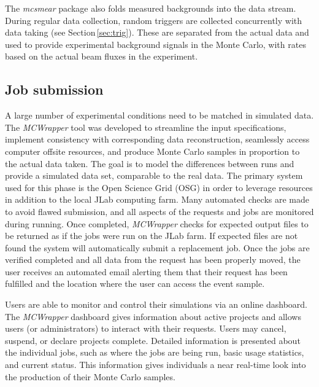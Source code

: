 The \textit{mcsmear} package also folds measured backgrounds into the data stream. During regular data collection, random triggers are collected concurrently with data taking (see Section\,\ref{sec:trig}). These are separated from the actual data and used to provide experimental background signals in the Monte Carlo, with rates based on the actual beam fluxes in the experiment. 

\subsection{Job submission \label{sec:jobsubmission}}
A large number of experimental conditions need to be matched in simulated data. The \emph{MCWrapper} tool was 
developed to streamline the input specifications, implement consistency with corresponding data reconstruction, seamlessly access computer offsite resources, and produce Monte Carlo samples in proportion to the actual data taken. The goal is to model the differences between runs and provide a simulated data set, comparable to the real data. The primary system used for this phase is the Open Science Grid (OSG) in order to leverage resources in addition to the local JLab computing farm. Many automated checks are made to avoid flawed submission, and all aspects of the requests and jobs are monitored during running. Once completed, \emph{MCWrapper} checks for expected output files to be returned as if the jobs were run on the JLab farm. If expected files are not found the system will automatically submit a replacement job. Once the jobs are verified completed and all data from the request has been properly moved, the user receives an automated email alerting them that their request has been fulfilled and the location where the user can access the event sample.

Users are able to monitor and control their simulations via an online dashboard. The \emph{MCWrapper} dashboard gives information about active projects and allows users (or administrators) to interact with their requests. Users may cancel, suspend, or declare projects complete. Detailed information is presented about the individual jobs, such as where the jobs are being run, basic usage statistics, and current status.  This information gives individuals a near real-time look into the production of their Monte Carlo samples.

